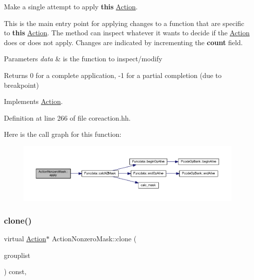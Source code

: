 Make a single attempt to apply {\bfseries{this}} \mbox{\hyperlink{class_action}{Action}}. 

This is the main entry point for applying changes to a function that are specific to {\bfseries{this}} \mbox{\hyperlink{class_action}{Action}}. The method can inspect whatever it wants to decide if the \mbox{\hyperlink{class_action}{Action}} does or does not apply. Changes are indicated by incrementing the {\bfseries{count}} field. 
\begin{DoxyParams}{Parameters}
{\em data} & is the function to inspect/modify \\
\hline
\end{DoxyParams}
\begin{DoxyReturn}{Returns}
0 for a complete application, -\/1 for a partial completion (due to breakpoint) 
\end{DoxyReturn}


Implements \mbox{\hyperlink{class_action_aac1c3999d6c685b15f5d9765a4d04173}{Action}}.



Definition at line 266 of file coreaction.\+hh.

Here is the call graph for this function\+:
\nopagebreak
\begin{figure}[H]
\begin{center}
\leavevmode
\includegraphics[width=350pt]{class_action_nonzero_mask_a585181ff1ba9a3ce19de0c9e939ac381_cgraph}
\end{center}
\end{figure}
\mbox{\label{class_action_nonzero_mask_aee9f54ce67eaa18b65d667304dfd2124}} 
\subsubsection{\texorpdfstring{clone()}{clone()}}
{\footnotesize\ttfamily virtual \mbox{\hyperlink{class_action}{Action}}$\ast$ Action\+Nonzero\+Mask\+::clone (\begin{DoxyParamCaption}\item[{const \mbox{\hyperlink{class_action_group_list}{Action\+Group\+List}} \&}]{grouplist }\end{DoxyParamCaption}) const\hspace{0.3cm}{\ttfamily [inline]}, {\ttfamily [virtual]}}



